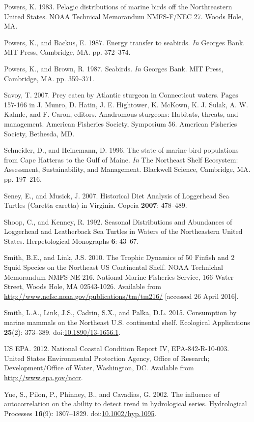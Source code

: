 \documentclass[11pt,]{article}
\begin{document}
\hypertarget{ref-powers_pelagic_1983}{}
Powers, K. 1983. Pelagic distributions of marine birds off the
Northreastern United States. NOAA Technical Memorandum NMFS-F/NEC 27.
Woods Hole, MA.

\hypertarget{ref-powers_energy_1987}{}
Powers, K., and Backus, E. 1987. Energy transfer to seabirds. \emph{In}
Georges Bank. MIT Press, Cambridge, MA. pp. 372--374.

\hypertarget{ref-powers_seabirds_1987}{}
Powers, K., and Brown, R. 1987. Seabirds. \emph{In} Georges Bank. MIT
Press, Cambridge, MA. pp. 359--371.

\hypertarget{ref-savoy_prey_2007}{}
Savoy, T. 2007. Prey eaten by Atlantic sturgeon in Connecticut waters.
Pages 157-166 in J. Munro, D. Hatin, J. E. Hightower, K. McKown, K. J.
Sulak, A. W. Kahnle, and F. Caron, editors. Anadromous sturgeons:
Habitats, threats, and management. American Fisheries Society, Symposium
56. American Fisheries Society, Bethesda, MD.

\hypertarget{ref-schneider_state_1996}{}
Schneider, D., and Heinemann, D. 1996. The state of marine bird
populations from Cape Hatteras to the Gulf of Maine. \emph{In} The
Northeast Shelf Ecosystem: Assessment, Sustainability, and Management.
Blackwell Science, Cambridge, MA. pp. 197--216.

\hypertarget{ref-seney_historical_2007}{}
Seney, E., and Musick, J. 2007. Historical Diet Analysis of Loggerhead
Sea Turtles (Caretta caretta) in Virginia. Copeia \textbf{2007}:
478--489.

\hypertarget{ref-shoop_seasonal_1992}{}
Shoop, C., and Kenney, R. 1992. Seasonal Distributions and Abundances of
Loggerhead and Leatherback Sea Turtles in Waters of the Northeastern
United States. Herpetological Monographs \textbf{6}: 43--67.

\hypertarget{ref-smith_trophic_2010}{}
Smith, B.E., and Link, J.S. 2010. The Trophic Dynamics of 50 Finfish and
2 Squid Species on the Northeast US Continental Shelf. NOAA Technichal
Memorandum NMFS-NE-216. National Marine Fisheries Service, 166 Water
Street, Woods Hole, MA 02543-1026. Available from
\url{http://www.nefsc.noaa.gov/publications/tm/tm216/} {[}accessed 26
April 2016{]}.

\hypertarget{ref-smith_consumption_2015}{}
Smith, L.A., Link, J.S., Cadrin, S.X., and Palka, D.L. 2015. Consumption
by marine mammals on the Northeast U.S. continental shelf. Ecological
Applications \textbf{25}(2): 373--389.
doi:\href{https://doi.org/10.1890/13-1656.1}{10.1890/13-1656.1}.

\hypertarget{ref-us_epa_national_2012}{}
US EPA. 2012. National Coastal Condition Report IV, EPA-842-R-10-003.
United States Environmental Protection Agency, Office of Research;
Development/Office of Water, Washington, DC. Available from
\url{http://www.epa.gov/nccr}.

\hypertarget{ref-yue_influence_2002}{}
Yue, S., Pilon, P., Phinney, B., and Cavadias, G. 2002. The influence of
autocorrelation on the ability to detect trend in hydrological series.
Hydrological Processes \textbf{16}(9): 1807--1829.
doi:\href{https://doi.org/10.1002/hyp.1095}{10.1002/hyp.1095}.
\end{document}
